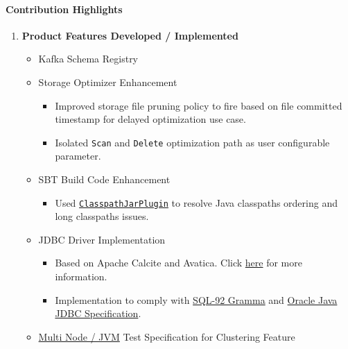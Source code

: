 \documentclass[
]{article}
\providecommand{\tightlist}{%
  \setlength{\itemsep}{0pt}\setlength{\parskip}{0pt}}
\begin{document}
\hypertarget{contribution-highlights-5}{%
\paragraph{Contribution Highlights}\label{contribution-highlights-5}}

\begin{enumerate}
\def\labelenumi{\arabic{enumi}.}
\tightlist
\item
  \textbf{Product Features Developed / Implemented}

  \begin{itemize}
  \tightlist
  \item
    Kafka Schema Registry
  \item
    Storage Optimizer Enhancement

    \begin{itemize}
    \tightlist
    \item
      Improved storage file pruning policy to fire based on file
      committed timestamp for delayed optimization use case.
    \item
      Isolated \texttt{Scan} and \texttt{Delete} optimization path as
      user configurable parameter.
    \end{itemize}
  \item
    SBT Build Code Enhancement

    \begin{itemize}
    \tightlist
    \item
      Used
      \href{http://sbt-native-packager.readthedocs.io/en/latest/recipes/longclasspath.html\#generate-a-classpath-jar}{\texttt{ClasspathJarPlugin}}
      to resolve Java classpaths ordering and long classpaths issues.
    \end{itemize}
  \item
    JDBC Driver Implementation

    \begin{itemize}
    \tightlist
    \item
      Based on Apache Calcite and Avatica. Click
      \protect\hyperlink{apache-calcite-avatica}{here} for more
      information.
    \item
      Implementation to comply with
      \href{https://en.wikipedia.org/wiki/SQL-92}{SQL-92 Gramma} and
      \href{http://download.oracle.com/otndocs/jcp/jdbc-4_1-mrel-spec/index.html}{Oracle
      Java JDBC Specification}.
    \end{itemize}
  \item
    \href{http://doc.akka.io/docs/akka/snapshot/dev/multi-node-testing.html}{Multi
    Node / JVM} Test Specification for Clustering Feature


\end{itemize}
\end{enumerate}
\end{document}
